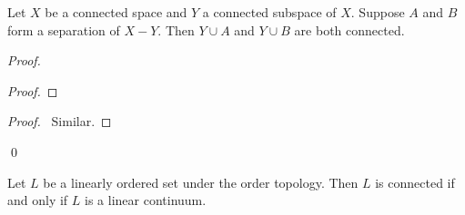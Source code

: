 \begin{proposition}
    Let $X$ be a connected space and $Y$ a connected subspace of $X$. Suppose $A$ and $B$ form a separation of $X - Y$. Then $Y \cup A$ and $Y \cup B$ are both connected.
\end{proposition}

\begin{proof}
    \pf
    \begin{proof}
    \end{proof}
    \begin{proof}
        \pf\ Similar.
    \end{proof}
    \qed
\end{proof}

\begin{theorem}
    \label{theorem:connected_continuum}
    Let $L$ be a linearly ordered set under the order topology. Then $L$ is connected if and only if $L$ is a linear continuum.
\end{theorem}

